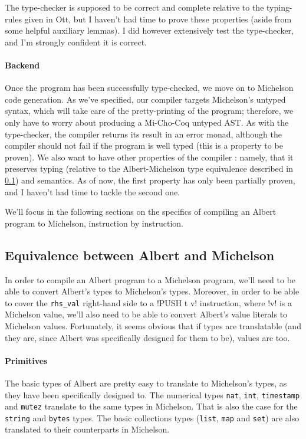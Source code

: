 \documentclass{report}
\begin{document}
The type-checker is supposed to be correct and complete relative to the typing-rules given in Ott, but I haven't had time to prove these properties (aside from some helpful auxiliary lemmas). I did however extensively test the type-checker, and I'm strongly confident it is correct.

\paragraph{Backend}

Once the program has been successfully type-checked, we move on to Michelson code generation. As we've specified, our compiler targets Michelson's untyped syntax, which will take care of the pretty-printing of the program; therefore, we only have to worry about producing a Mi-Cho-Coq untyped AST. As with the type-checker, the compiler returns its result in an error monad, although the compiler should not fail if the program is well typed (this is a property to be proven). We also want to have other properties of the compiler : namely, that it preserves typing (relative to the Albert-Michelson type equivalence described in \ref{alberteqmichelson}) and semantics. As of now, the first property has only been partially proven, and I haven't had time to tackle the second one.

We'll focus in the following sections on the specifics of compiling an Albert program to Michelson, instruction by instruction.

\subsection{Equivalence between Albert and Michelson}
\label{alberteqmichelson}

In order to compile an Albert program to a Michelson program, we'll need to be able to convert Albert's types to Michelson's types. Moreover, in order to be able to cover the \texttt{rhs\_val} right-hand side to a !PUSH t v! instruction, where !v! is a Michelson value, we'll also need to be able to convert Albert's value literals to Michelson values. Fortunately, it seems obvious that if types are translatable (and they are, since Albert was specifically designed for them to be), values are too.

\paragraph{Primitives}

The basic types of Albert are pretty easy to translate to Michelson's types, as they have been specifically designed to. The numerical types \texttt{nat}, \texttt{int}, \texttt{timestamp} and \texttt{mutez} translate to the same types in Michelson. That is also the case for the \texttt{string} and \texttt{bytes} types. The basic collections types (\texttt{list}, \texttt{map} and \texttt{set}) are also translated to their counterparts in Michelson.
\end{document}
